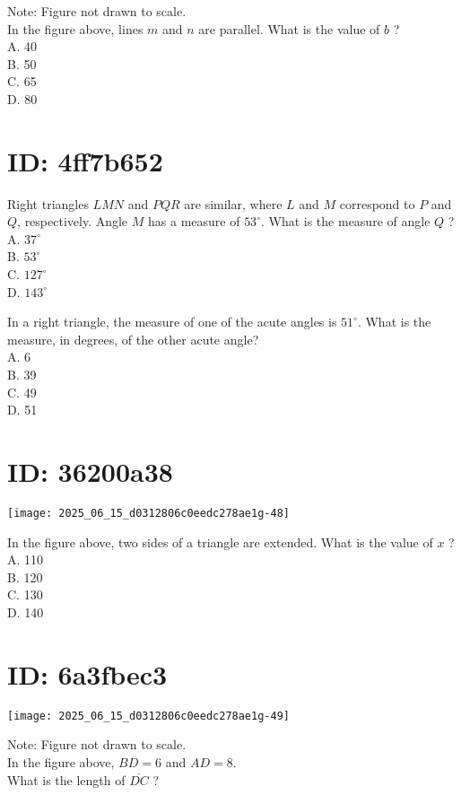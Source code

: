 Note: Figure not drawn to scale.\\
In the figure above, lines $m$ and $n$ are parallel. What is the value of $b$ ?\\
A. 40\\
B. 50\\
C. 65\\
D. 80

\section*{ID: 4ff7b652}
Right triangles $L M N$ and $P Q R$ are similar, where $L$ and $M$ correspond to $P$ and $Q$, respectively. Angle $M$ has a measure of $53^{\circ}$. What is the measure of angle $Q$ ?\\
A. $37^{\circ}$\\
B. $53^{\circ}$\\
C. $127^{\circ}$\\
D. $143^{\circ}$

In a right triangle, the measure of one of the acute angles is $51^{\circ}$. What is the measure, in degrees, of the other acute angle?\\
A. 6\\
B. 39\\
C. 49\\
D. 51

\section*{ID: 36200a38}
\begin{center}
\texttt{[image: 2025\_06\_15\_d0312806c0eedc278ae1g-48]}
\end{center}

In the figure above, two sides of a triangle are extended. What is the value of $x$ ?\\
A. 110\\
B. 120\\
C. 130\\
D. 140

\section*{ID: 6a3fbec3}
\begin{center}
\texttt{[image: 2025\_06\_15\_d0312806c0eedc278ae1g-49]}
\end{center}

Note: Figure not drawn to scale.\\
In the figure above, $B D=6$ and $A D=8$.\\
What is the length of $\overline{D C}$ ?


